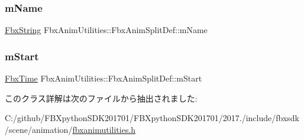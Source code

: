 \subsubsection{\texorpdfstring{m\+Name}{mName}}
{\footnotesize\ttfamily \hyperlink{class_fbx_string}{Fbx\+String} Fbx\+Anim\+Utilities\+::\+Fbx\+Anim\+Split\+Def\+::m\+Name}

\mbox{\label{class_fbx_anim_utilities_1_1_fbx_anim_split_def_af8aad5671b9f1bef7a5af4a226a0f646}} 
\subsubsection{\texorpdfstring{m\+Start}{mStart}}
{\footnotesize\ttfamily \hyperlink{class_fbx_time}{Fbx\+Time} Fbx\+Anim\+Utilities\+::\+Fbx\+Anim\+Split\+Def\+::m\+Start}



このクラス詳解は次のファイルから抽出されました\+:\begin{DoxyCompactItemize}
\item 
C\+:/github/\+F\+B\+Xpython\+S\+D\+K201701/\+F\+B\+Xpython\+S\+D\+K201701/2017./include/fbxsdk/scene/animation/\hyperlink{fbxanimutilities_8h}{fbxanimutilities.\+h}\end{DoxyCompactItemize}
